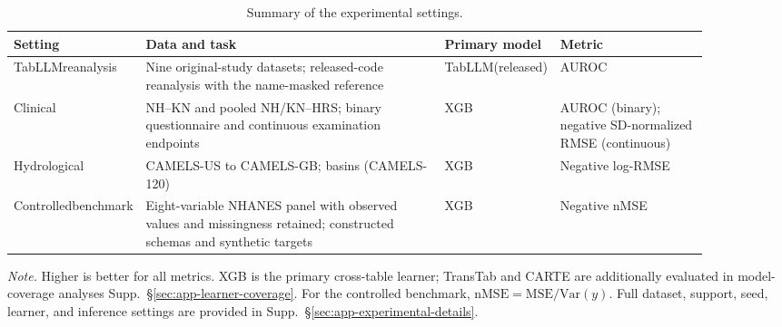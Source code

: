 \documentclass{article} %
\newcommand{\supp}[1]{\textnormal{Supp.~#1}}
\begin{document}
\begin{table}[h]
\caption{Summary of the experimental settings.}
\label{tab:experimental_settings}
\centering
\fontsize{8pt}{9pt}\selectfont
\setlength{\tabcolsep}{3pt}

\begin{tabular}{@{}p{0.12\linewidth}p{0.45\linewidth}p{0.1\linewidth}p{0.22\linewidth}@{}}
\toprule
Setting & Data and task & Primary model & Metric \\
\midrule

TabLLM\newline reanalysis &
Nine original-study datasets; released-code reanalysis with the name-masked reference &
TabLLM\newline (released) &
AUROC \\

\midrule

Clinical &
NH--KN and pooled NH/KN--HRS; binary questionnaire and continuous examination endpoints &
XGB &
AUROC (binary); \newline negative SD-normalized RMSE (continuous) \\

\addlinespace

Hydrological &
CAMELS-US to CAMELS-GB; \newline 120 basins (CAMELS-120) &
XGB &
Negative log-RMSE \\

\midrule

Controlled\newline benchmark &
Eight-variable NHANES panel with observed values and missingness retained; constructed schemas and synthetic targets &
XGB &
Negative nMSE \\

\bottomrule
\end{tabular}

\vspace{2pt}

\begin{minipage}{\linewidth}
\fontsize{8pt}{9pt}\selectfont
\emph{Note.}
Higher is better for all metrics.
XGB is the primary cross-table learner; TransTab and CARTE are additionally evaluated in model-coverage analyses \supp{\S\ref{sec:app-learner-coverage}}.
For the controlled benchmark, $\mathrm{nMSE}=\mathrm{MSE}/\mathrm{Var}(y)$.
Full dataset, support, seed, learner, and inference settings are provided in \supp{\S\ref{sec:app-experimental-details}}.
\end{minipage}
\end{table}
\end{document}
